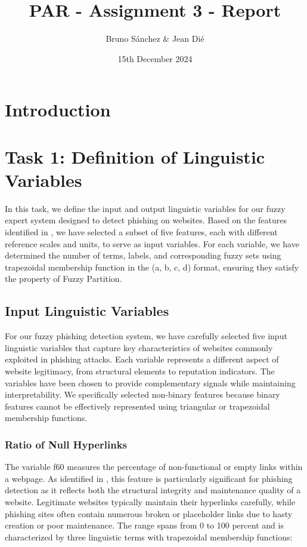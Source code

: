 \documentclass{article}
\begin{document}
\title{PAR - Assignment 3 - Report}
\author{\normalsize Bruno Sánchez \& Jean Dié}
\date{\small 15th December 2024}

\maketitle

\newpage
\tableofcontents
\newpage

\section{Introduction}


\section{Task 1: Definition of Linguistic Variables}

In this task, we define the input and output linguistic variables for our fuzzy expert system designed to detect phishing on websites. Based on the features identified in \cite{Hannousse2020-eq}, we have selected a subset of five features, each with different reference scales and units, to serve as input variables. For each variable, we have determined the number of terms, labels, and corresponding fuzzy sets using trapezoidal membership function in the (a, b, c, d) format, ensuring they satisfy the property of Fuzzy Partition.


\subsection{Input Linguistic Variables}

For our fuzzy phishing detection system, we have carefully selected five input linguistic variables that capture key characteristics of websites commonly exploited in phishing attacks. Each variable represents a different aspect of website legitimacy, from structural elements to reputation indicators. The variables have been chosen to provide complementary signals while maintaining interpretability. We specifically selected non-binary features because binary features cannot be effectively represented using triangular or trapezoidal membership functions.

\subsubsection{Ratio of Null Hyperlinks}
The variable f60 measures the percentage of non-functional or empty links within a webpage. As identified in \cite{Hannousse2020-eq}, this feature is particularly significant for phishing detection as it reflects both the structural integrity and maintenance quality of a website. Legitimate websites typically maintain their hyperlinks carefully, while phishing sites often contain numerous broken or placeholder links due to hasty creation or poor maintenance. The range spans from 0 to 100 percent and is characterized by three linguistic terms with trapezoidal membership functions:
\end{document}
